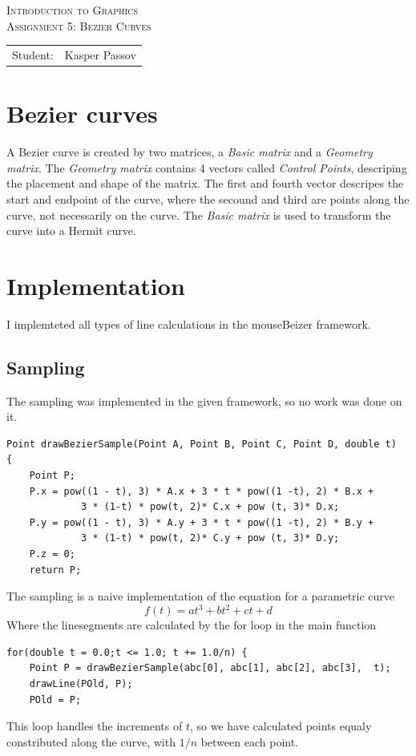 \documentclass{article}
\begin{document}
\begin{titlepage}
\begin{center}
\textsc{Introduction to Graphics}\\[0.5cm]
\textsc{Assignment 5: Bezier Curves}\\[0.5cm]
\vspace{2 cm}
\begin{tabular}{ll}
Student: & Kasper Passov\\
\end{tabular}
\end{center}
\vspace{5 cm}
\newpage
\end{titlepage}

\section{Bezier curves}
A Bezier curve is created by two matrices, a \emph{Basic matrix} and a \emph{Geometry matrix}. The 
\emph{Geometry matrix} contains 4 vectors called \emph{Control Points}, descriping the placement 
and shape of the matrix. The first and fourth vector descripes the start and endpoint of the
curve, where the secound and third are points along the curve, not necessarily on the curve.
The \emph{Basic matrix} is used to transform the curve into a Hermit curve.

\section{Implementation}
I implemteted all types of line calculations in the mouseBeizer framework.

\subsection{Sampling}
The sampling was implemented in the given framework, so no work was done on it.
\begin{verbatim}
Point drawBezierSample(Point A, Point B, Point C, Point D, double t) 
{ 
    Point P;
    P.x = pow((1 - t), 3) * A.x + 3 * t * pow((1 -t), 2) * B.x + 
             3 * (1-t) * pow(t, 2)* C.x + pow (t, 3)* D.x;
    P.y = pow((1 - t), 3) * A.y + 3 * t * pow((1 -t), 2) * B.y + 
             3 * (1-t) * pow(t, 2)* C.y + pow (t, 3)* D.y;
	P.z = 0;
    return P;
\end{verbatim}
The sampling is a naive implementation of the equation for a parametric curve
\begin{equation*}
    f(t) = at^3 + bt^2 + ct + d
\end{equation*}
Where the linesegments are calculated by the for loop in the main function
\begin{verbatim}
for(double t = 0.0;t <= 1.0; t += 1.0/n) {
    Point P = drawBezierSample(abc[0], abc[1], abc[2], abc[3],  t);
    drawLine(POld, P);
    POld = P;
\end{verbatim}
This loop handles the increments of $t$, so we have calculated points equaly constributed along the curve,
with $1/n$ between each point.
\end{document}
